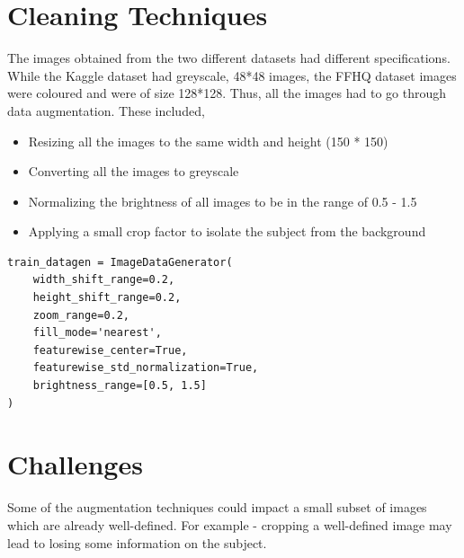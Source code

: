\section{Cleaning Techniques}
\noindent The images obtained from the two different datasets had different specifications. While the Kaggle \cite{KaggleDataset} dataset had greyscale, 48*48 images, the FFHQ \cite{FFHQ} dataset images were coloured and were of size 128*128. Thus, all the images had to go through data augmentation. These included,
\begin{itemize}
    \item  Resizing all the images to the same width and height (150 * 150)
    \item Converting all the images to greyscale
    \item Normalizing the brightness of all images to be in the range of 0.5 - 1.5 
    \item Applying a small crop factor to isolate the subject from the background
\end{itemize}

\lstset{
  language=Python,
  basicstyle=\ttfamily,
  numbers=left,
  frame=single,
  captionpos=b,
}

\begin{lstlisting}[caption={Augmenting the dataset using Keras \cite{Keras}}]
train_datagen = ImageDataGenerator(
    width_shift_range=0.2,
    height_shift_range=0.2,
    zoom_range=0.2,        
    fill_mode='nearest',
    featurewise_center=True,
    featurewise_std_normalization=True,
    brightness_range=[0.5, 1.5] 
)
\end{lstlisting}

\hspace*{1em}
\section{Challenges}
\noindent Some of the augmentation techniques could impact a small subset of images which are already well-defined. For example - cropping a well-defined image may lead to losing some information on the subject.\\

\pagebreak
